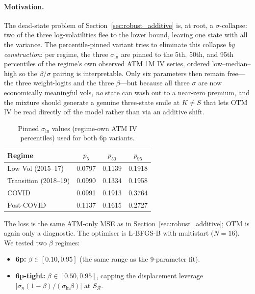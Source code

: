 \documentclass[12pt]{article}
\begin{document}
\paragraph{Motivation.} The dead-state problem of Section~\ref{sec:robust_additive} is, at root, a $\sigma$-collapse: two of the three log-volatilities flee to the lower bound, leaving one state with all the variance. The percentile-pinned variant tries to eliminate this collapse \emph{by construction}: per regime, the three $\sigma_{\ln}$ are pinned to the 5th, 50th, and 95th percentiles of the regime's own observed ATM 1M IV series, ordered low--median--high so the $\beta$/$\sigma$ pairing is interpretable. Only six parameters then remain free---the three weight-logits and the three $\beta$---but because all three $\sigma$ are now economically meaningful vols, \emph{no} state can wash out to a near-zero premium, and the mixture should generate a genuine three-state smile at $K \ne S$ that lets OTM IV be read directly off the model rather than via an additive shift.

\begin{table}[htbp]
\centering
\caption{Pinned $\sigma_{\ln}$ values (regime-own ATM IV percentiles) used for both 6p variants.}
\label{tab:pinned_sigma}
\small
\begin{tabular}{lccc}
\toprule
Regime & $p_5$ & $p_{50}$ & $p_{95}$ \\
\midrule
Low Vol (2015--17) & 0.0797 & 0.1139 & 0.1918 \\
Transition (2018--19) & 0.0990 & 0.1334 & 0.1958 \\
COVID & 0.0991 & 0.1913 & 0.3764 \\
Post-COVID & 0.1137 & 0.1615 & 0.2727 \\
\bottomrule
\end{tabular}
\end{table}

The loss is the same ATM-only MSE as in Section~\ref{sec:robust_additive}; OTM is again only a diagnostic. The optimiser is L-BFGS-B with multistart ($N=16$). We tested two $\beta$ regimes:

\begin{itemize}
  \item \textbf{6p:} $\beta \in [0.10, 0.95]$ (the same range as the 9-parameter fit).
  \item \textbf{6p-tight:} $\beta \in [0.50, 0.95]$, capping the displacement leverage $|\sigma_n (1-\beta)/(\sigma_{\ln}\beta)|$ at $\bar S_{\mathcal R}$.
\end{itemize}
\end{document}
